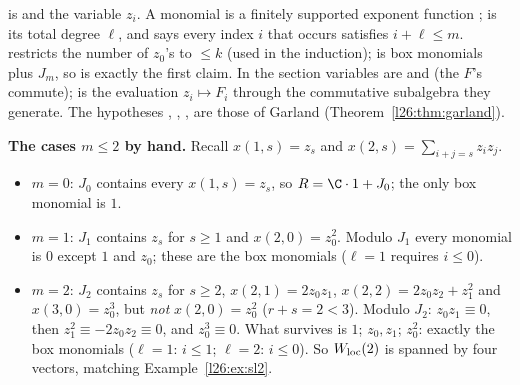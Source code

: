 \begin{dictionary}
 is  and  the variable $z_i$. A monomial is a finitely supported exponent
function ;  is its total degree $\ell$, and  says every index $i$
that occurs satisfies $i+\ell\le m$.  restricts the number of $z_0$'s to $\le k$ (used in the induction);
 is box monomials plus $J_m$, so  is exactly the first claim. In  the
section variables are  and  (the $F$'s commute);  is the
evaluation $z_i\mapsto F_i$ through the commutative subalgebra they generate. The hypotheses , ,
,  are those of Garland (Theorem~\ref{l26:thm:garland}).
\end{dictionary}

\textbf{The cases $m\le2$ by hand.} Recall $x(1,s)=z_s$ and $x(2,s)=\sum_{i+j=s}z_iz_j$.
\begin{itemize}
\item $m=0$: $J_0$ contains every $x(1,s)=z_s$, so $R=\C\cdot1+J_0$; the only box monomial is $1$.
\item $m=1$: $J_1$ contains $z_s$ for $s\ge1$ and $x(2,0)=z_0^2$. Modulo $J_1$ every monomial is $0$ except $1$ and $z_0$; these are
  the box monomials ($\ell=1$ requires $i\le0$).
\item $m=2$: $J_2$ contains $z_s$ for $s\ge2$, $x(2,1)=2z_0z_1$, $x(2,2)=2z_0z_2+z_1^2$ and $x(3,0)=z_0^3$, but \emph{not}
  $x(2,0)=z_0^2$ ($r+s=2<3$). Modulo $J_2$: $z_0z_1\equiv0$, then $z_1^2\equiv-2z_0z_2\equiv0$, and $z_0^3\equiv0$. What survives is
  $1$; $z_0,z_1$; $z_0^2$: exactly the box monomials ($\ell=1$: $i\le1$; $\ell=2$: $i\le0$). So $W_{\mathrm{loc}}(2)$ is spanned by
  four vectors, matching Example~\ref{l26:ex:sl2}.
\end{itemize}


